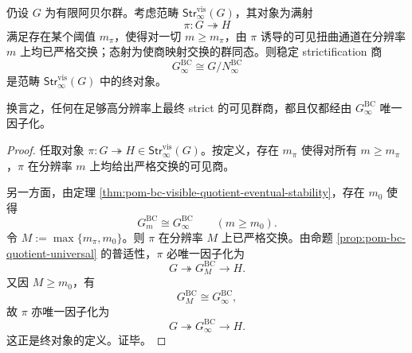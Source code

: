 \begin{theorem}\label{thm:xi-terminal-gbc-stabilized-terminal-object}
仍设 \(G\) 为有限阿贝尔群。考虑范畴 \(\mathsf{Str}^{\mathrm{vis}}_\infty(G)\)，其对象为满射
\[
\pi:G\twoheadrightarrow H
\]
满足存在某个阈值 \(m_\pi\)，使得对一切 \(m\ge m_\pi\)，由 \(\pi\) 诱导的可见扭曲通道在分辨率 \(m\) 上均已严格交换；态射为使商映射交换的群同态。则稳定 strictification 商
\[
G_\infty^{\mathrm{BC}}
\cong
G/N_\infty^{\mathrm{BC}}
\]
是范畴 \(\mathsf{Str}^{\mathrm{vis}}_\infty(G)\) 中的终对象。

换言之，任何在足够高分辨率上最终 strict 的可见群商，都且仅都经由 \(G_\infty^{\mathrm{BC}}\) 唯一因子化。
\end{theorem}

\begin{proof}
任取对象 \(\pi:G\twoheadrightarrow H\in\mathsf{Str}^{\mathrm{vis}}_\infty(G)\)。按定义，存在 \(m_\pi\) 使得对所有 \(m\ge m_\pi\)，\(\pi\) 在分辨率 \(m\) 上均给出严格交换的可见商。

另一方面，由定理 \ref{thm:pom-bc-visible-quotient-eventual-stability}，存在 \(m_0\) 使得
\[
G_m^{\mathrm{BC}}\cong G_\infty^{\mathrm{BC}}
\qquad(m\ge m_0).
\]
令 \(M:=\max\{m_\pi,m_0\}\)。则 \(\pi\) 在分辨率 \(M\) 上已严格交换。由命题 \ref{prop:pom-bc-quotient-universal} 的普适性，\(\pi\) 必唯一因子化为
\[
G\twoheadrightarrow G_M^{\mathrm{BC}}\longrightarrow H.
\]
又因 \(M\ge m_0\)，有
\[
G_M^{\mathrm{BC}}\cong G_\infty^{\mathrm{BC}},
\]
故 \(\pi\) 亦唯一因子化为
\[
G\twoheadrightarrow G_\infty^{\mathrm{BC}}\longrightarrow H.
\]
这正是终对象的定义。证毕。
\end{proof}

\endinput
